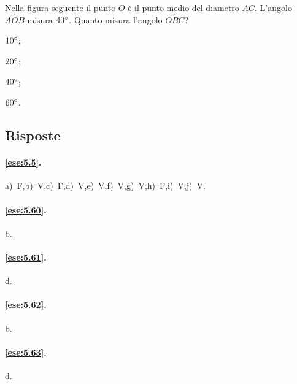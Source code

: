 \noindent\begin{minipage}{0.65\textwidth}\parindent15pt
\begin{esercizio}
\label{ese:5.68}
Nella figura seguente il punto $O$ è il punto medio del diametro $AC$. L'angolo $A\widehat{O}B$ misura $40{}^{\circ}$. Quanto misura l'angolo $O\widehat{B}C$? 
\begin{multicols}{4}
\begin{enumeratea}
\item $10{}^{\circ}$;
\item $20{}^{\circ}$;
\item $40{}^{\circ}$;
\item $60{}^{\circ}$.
\end{enumeratea}
\end{multicols}
\end{esercizio}
\end{minipage}\hfil
\begin{minipage}{0.35\textwidth}
	\centering
\end{minipage}\vspace{5pt}


\subsection{Risposte}

\begingroup
\hypersetup{linkcolor=black}

\paragraph{\ref{ese:5.5}.}
a)~F,\quad b)~V,\quad c)~F,\quad d)~V,\quad e)~V,\quad f)~V,\quad g)~V,\quad h)~F,\quad i)~V,\quad j)~V.

\paragraph{\ref{ese:5.60}.}
b.

\paragraph{\ref{ese:5.61}.}
d.

\paragraph{\ref{ese:5.62}.}
b.

\paragraph{\ref{ese:5.63}.}
d.


